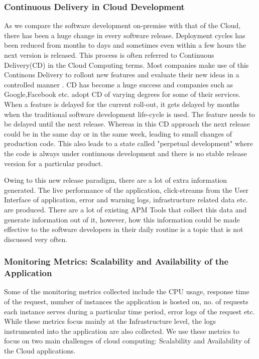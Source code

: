 \documentclass[article,type=msc,colorback,12pt,accentcolor=tud7b]{tudthesis}
\begin{document}
 	\subsubsection{Continuous Delivery in Cloud Development}
 	As we compare the software development on-premise with that of the Cloud, there has been a huge change in every software release. Deployment cycles has been reduced from months to days and sometimes even within a few hours the next version is released. This process is often referred to Continuous Delivery(CD) in the Cloud Computing terms. Most companies make use of this Continous Delivery to rollout new features and evaluate their new ideas in a controlled manner \cite{kohavi2007practical}. CD has become a huge success and companies such as Google,Facebook etc. adopt CD of varying degrees for some of their services. When a feature is delayed for the current roll-out, it gets delayed by months when the traditional software development life-cycle is used. The feature needs to be delayed until the next release. Whereas in this CD approach the next release could be in the same day or in the same week, leading to small changes of production code. This also leads to a state called "perpetual development" where the code is always under continuous development and there is no stable release version for a particular product.  	\par Owing to this new release paradigm, there are a lot of extra information generated. The live performance of the application, click-streams from the User Interface of application, error and warning logs, infrastructure related data etc. are produced. There are a lot of existing APM Tools that collect this data and generate information out of it, however, how this information could be made effective to the software developers in their daily routine is a topic that is not discussed very often. 
 	
 	\subsubsection{Monitoring Metrics: Scalability and Availability of the Application}
 	
	Some of the monitoring metrics collected include the CPU usage, response time of the request, number of instances the application is hosted on, no. of requests each instance serves during a particular time period, error logs of the request etc. While these metrics focus mainly at the Infrastructure level, the logs instrumented into the application are also collected. We use these metrics to focus on two main challenges of cloud computing: Scalability and Availability of the Cloud applications.
	
\end{document}
